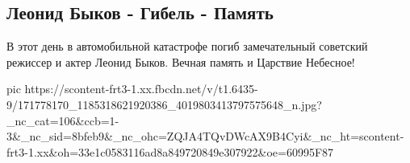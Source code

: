  
 
 
 
 

\subsection{Леонид Быков - Гибель - Память}
\label{sec:11_04_2021.fb.berdnik_miroslava.5.bykov_leonid_pamjat}

В этот день в автомобильной катастрофе погиб замечательный советский режиссер и
актер Леонид Быков.  Вечная память и Царствие Небесное!

\ifcmt
  pic https://scontent-frt3-1.xx.fbcdn.net/v/t1.6435-9/171778170_1185318621920386_4019803413797575648_n.jpg?_nc_cat=106&ccb=1-3&_nc_sid=8bfeb9&_nc_ohc=ZQJA4TQvDWcAX9B4Cyi&_nc_ht=scontent-frt3-1.xx&oh=33e1c0583116ad8a849720849e307922&oe=60995F87
\fi

